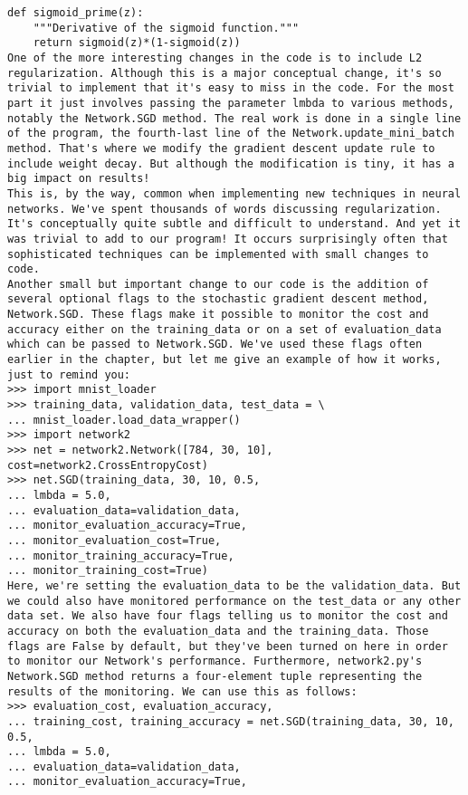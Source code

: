 \begin{lstlisting}
def sigmoid_prime(z):
    """Derivative of the sigmoid function."""
    return sigmoid(z)*(1-sigmoid(z))
One of the more interesting changes in the code is to include L2 regularization. Although this is a major conceptual change, it's so trivial to implement that it's easy to miss in the code. For the most part it just involves passing the parameter lmbda to various methods, notably the Network.SGD method. The real work is done in a single line of the program, the fourth-last line of the Network.update_mini_batch method. That's where we modify the gradient descent update rule to include weight decay. But although the modification is tiny, it has a big impact on results!
This is, by the way, common when implementing new techniques in neural networks. We've spent thousands of words discussing regularization. It's conceptually quite subtle and difficult to understand. And yet it was trivial to add to our program! It occurs surprisingly often that sophisticated techniques can be implemented with small changes to code.
Another small but important change to our code is the addition of several optional flags to the stochastic gradient descent method, Network.SGD. These flags make it possible to monitor the cost and accuracy either on the training_data or on a set of evaluation_data which can be passed to Network.SGD. We've used these flags often earlier in the chapter, but let me give an example of how it works, just to remind you:
>>> import mnist_loader
>>> training_data, validation_data, test_data = \
... mnist_loader.load_data_wrapper()
>>> import network2
>>> net = network2.Network([784, 30, 10], cost=network2.CrossEntropyCost)
>>> net.SGD(training_data, 30, 10, 0.5,
... lmbda = 5.0,
... evaluation_data=validation_data,
... monitor_evaluation_accuracy=True,
... monitor_evaluation_cost=True,
... monitor_training_accuracy=True,
... monitor_training_cost=True)
Here, we're setting the evaluation_data to be the validation_data. But we could also have monitored performance on the test_data or any other data set. We also have four flags telling us to monitor the cost and accuracy on both the evaluation_data and the training_data. Those flags are False by default, but they've been turned on here in order to monitor our Network's performance. Furthermore, network2.py's Network.SGD method returns a four-element tuple representing the results of the monitoring. We can use this as follows:
>>> evaluation_cost, evaluation_accuracy, 
... training_cost, training_accuracy = net.SGD(training_data, 30, 10, 0.5,
... lmbda = 5.0,
... evaluation_data=validation_data,
... monitor_evaluation_accuracy=True,

\end{lstlisting}
